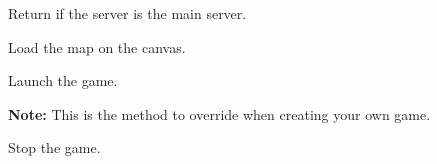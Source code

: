\documentclass[letterpaper,10pt,english]{sphinxmanual}
\begin{document}
\begin{fulllineitems}
\begin{fulllineitems}
\label{api:game.Game.is_main_server}
Return if the server is the main server.

\end{fulllineitems}


\begin{fulllineitems}
\label{api:game.Game.load_map}
Load the map on the canvas.

\end{fulllineitems}


\begin{fulllineitems}
\label{api:game.Game.start}
Launch the game.

\textbf{Note:} This is the method to override when creating your own game.

\end{fulllineitems}


\begin{fulllineitems}
\label{api:game.Game.stop}
Stop the game.

\end{fulllineitems}


\end{fulllineitems}

\end{document}

